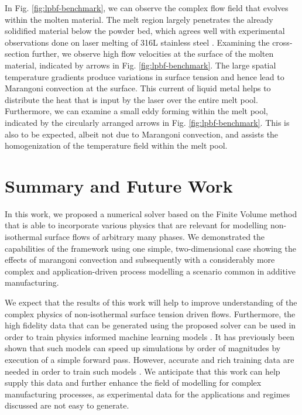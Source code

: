 \documentclass[conference,final,a4paper]{IEEEtran}
\begin{document}
In Fig. \ref{fig:lpbf-benchmark}, we can observe the complex flow field that evolves within the molten material. The melt region largely penetrates the already solidified material below the powder bed, which agrees well with experimental observations done on laser melting of 316L stainless steel \cite{mohrInSituDefectDetection2020}.
Examining the cross-section further, we observe high flow velocities at the surface of the molten material, indicated by arrows in Fig. \ref{fig:lpbf-benchmark}. The large spatial temperature gradients produce variations in surface tension and hence lead to Marangoni convection at the surface. This current of liquid metal helps to distribute the heat that is input by the laser over the entire melt pool.
Furthermore, we can examine a small eddy forming within the melt pool, indicated by the circularly arranged arrows in Fig. \ref{fig:lpbf-benchmark}. This is also to be expected, albeit not due to Marangoni convection, and assists the homogenization of the temperature field within the melt pool.

\section{Summary and Future Work}

In this work, we proposed a numerical solver based on the Finite Volume method that is able to incorporate various physics that are relevant for modelling non-isothermal surface flows of arbitrary many phases. We demonstrated the capabilities of the framework using one simple, two-dimensional case showing the effects of marangoni convection and subsequently with a considerably more complex and application-driven process modelling a scenario common in additive manufacturing.

We expect that the results of this work will help to improve understanding of the complex physics of non-isothermal surface tension driven flows. Furthermore, the high fidelity data that can be generated using the proposed solver can be used in order to train physics informed machine learning models \cite{karniadakisPhysicsinformedMachineLearning2021}. It has previously been shown that such models can speed up simulations by order of magnitudes by execution of a simple forward pass. However, accurate and rich training data are needed in order to train such models \cite{liFourierNeuralOperator2021,luDeepONetLearningNonlinear2020}. We anticipate that this work can help supply this data and further enhance the field of modelling for complex manufacturing processes, as experimental data for the applications and regimes discussed are not easy to generate.
\end{document}
